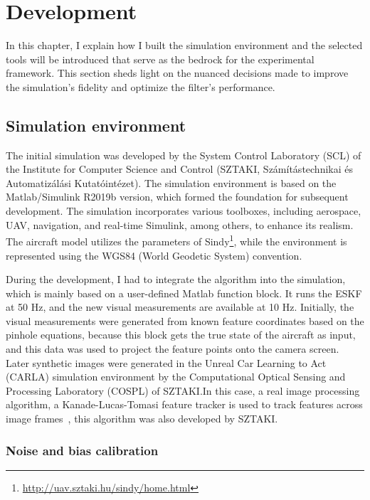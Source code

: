 \chapter{Development}\label{chap:dev}

In this chapter, I explain how I built the simulation environment and the selected tools will be introduced that serve as the bedrock for the experimental framework. This section sheds light on the nuanced decisions made to improve the simulation's fidelity and optimize the filter's performance. 

\section{Simulation environment}

The initial simulation was developed by the System Control Laboratory (SCL) of the Institute for Computer Science and Control (SZTAKI, Számítástechnikai és Automatizálási Kutatóintézet). The simulation environment is based on the Matlab/Simulink R2019b version, which formed the foundation for subsequent development. The simulation incorporates various toolboxes, including aerospace, UAV, navigation, and real-time Simulink, among others, to enhance its realism. The aircraft model utilizes the parameters of Sindy\footnote{\url{http://uav.sztaki.hu/sindy/home.html}}, while the environment is represented using the WGS84 (World Geodetic System) convention.

During the development, I had to integrate the algorithm into the simulation, which is mainly based on a user-defined Matlab function block. It runs the ESKF at 50 \si{\hertz}, and the new visual measurements are available at 10 \si{\hertz}. Initially, the visual measurements were generated from known feature coordinates based on the pinhole equations, because this block gets the true state of the aircraft as input, and this data was used to project the feature points onto the camera screen. Later synthetic images were generated in the Unreal Car Learning to Act (CARLA) simulation environment by the Computational Optical Sensing and Processing Laboratory (COSPL) of SZTAKI.\@ In this case, a real image processing algorithm, a Kanade-Lucas-Tomasi feature tracker is used to track features across image frames~\cite{KLT}, this algorithm was also developed by SZTAKI.\@ 

\subsection{Noise and bias calibration}

